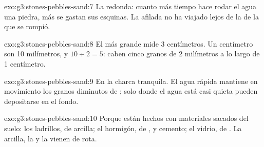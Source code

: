 \begin{solution}{exo:g3:stones-pebbles-sand:7}
La redonda: cuanto más tiempo hace rodar el agua una piedra, más se gastan
sus esquinas. La afilada no ha viajado lejos de la  de la que se rompió.
\end{solution}

\begin{solution}{exo:g3:stones-pebbles-sand:8}
El  más grande mide 3 centímetros. Un centímetro son 10 milímetros, y
$10 \div 2 = 5$: caben cinco granos de 2 milímetros a lo largo de
1 centímetro.
\end{solution}

\begin{solution}{exo:g3:stones-pebbles-sand:9}
En la charca tranquila. El agua rápida mantiene en movimiento los granos
diminutos de ; solo donde el agua está casi quieta pueden depositarse
en el fondo.
\end{solution}

\begin{solution}{exo:g3:stones-pebbles-sand:10}
Porque están hechos con materiales sacados del suelo: los ladrillos, de
arcilla; el hormigón, de ,  y cemento; el vidrio, de . La
arcilla, la  y la  vienen de  rota.
\end{solution}
